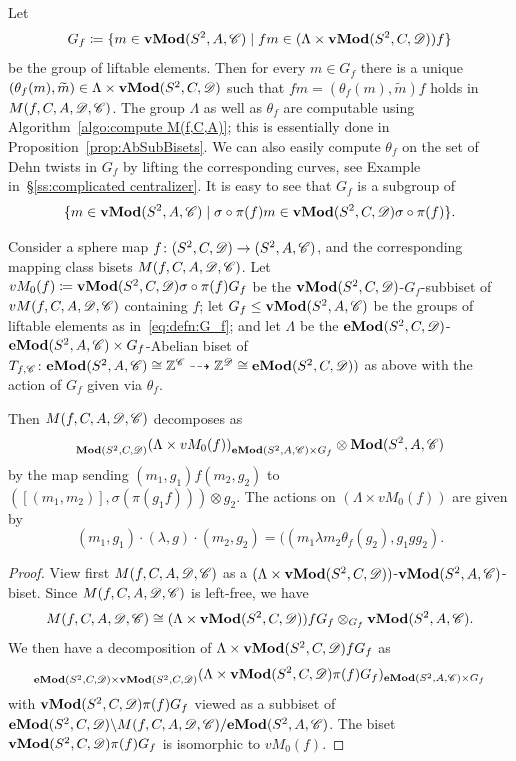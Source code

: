 \documentclass{amsart}
\begin{document}
Let
\begin{equation}\label{eq:defn:G_f}
  G_f\coloneqq \{m\in  \Mod[v](S^2,A,\CC) \mid f m\in(\Lambda\times \Mod[v](S^2,C,\DD))f\}
\end{equation}
be the group of liftable elements. Then for every $m\in G_f$ there is
a unique
$(\theta_f(m), \widetilde m)\in \Lambda\times\Mod[v](S^2,C,\DD)$ such
that $f m=(\theta_f(m), \widetilde m)f$ holds in
$M(f,C,A,\DD,\CC)$. The group $\Lambda$ as well as $\theta_f$ are
computable using Algorithm~\ref{algo:compute M(f,C,A)}; this is
essentially done in Proposition~\ref{prop:AbSubBisets}. We can also
easily compute $\theta_f$ on the set of Dehn twists in $G_f$ by
lifting the corresponding curves, see Example in~\S\ref{ss:complicated
  centralizer}.  It is easy to see that $G_f$ is a subgroup of
\[ \{m\in\Mod[v](S^2,A,\CC) \mid \sigma\circ \pi(f)m\in\Mod[v](S^2,C,\DD) \sigma\circ\pi(f)\}.\]

\begin{thm}\label{thm:M xproduct}
  Consider a sphere map $f\colon(S^2,C,\DD) \to (S^2,A,\CC)$, and the
  corresponding mapping class bisets $M(f,C,A,\DD, \CC)$. Let
  $vM_0(f)\coloneqq \Mod[v](S^2,C,\DD) \sigma\circ \pi(f) G_f$ be the
  $ \Mod[v](S^2,C,\DD)$-$G_f$-subbiset of $vM(f,C,A,\DD, \CC)$
  containing $f$; let $G_f\le \Mod[v](S^2,A,\CC)$ be the groups of
  liftable elements as in~\eqref{eq:defn:G_f}; and let $\Lambda$ be
  the $\Mod[e](S^2,C,\DD)$-$\Mod[e](S^2,A,\CC) \times G_f$-Abelian
  biset of
  $T_{f,\CC}\colon \Mod[e](S^2,A,\CC) \cong \Z^\CC\dashrightarrow
  \Z^\DD\cong \Mod[e](S^2,C,\DD))$ as above with the action of $G_f$
  given via $\theta_f$.

  \noindent Then $M(f,C,A,\DD,\CC)$ decomposes as
  \[\subscript{\Mod(S^2,C,\DD)}{(\Lambda\times vM_0(f))}_{ \Mod[e](S^2,A,\CC) \times G_f} \otimes \Mod(S^2,A,\CC)
   \] by the map sending $(m_1,g_1)f(m_2,g_2)$ to
   $([(m_1,m_2)],\sigma(\pi(g_1 f)))\otimes g_2$. The actions on
   $(\Lambda\times vM_0(f))$ are given by
   \[(m_1,g_1)\cdot(\lambda,g)\cdot(m_2,g_2)=((m_1\lambda
     m_2\theta_f(g_2),g_1 g g_2).\]
\end{thm}   
\begin{proof}
  View first $M(f,C,A,\DD,\CC)$ as a
  $(\Lambda\times\Mod[v](S^2,C,\DD))$-$\Mod[v](S^2,A,\CC)$-biset. Since
  $M(f,C,A,\DD,\CC)$ is left-free, we have
  \[M(f,C,A,\DD,\CC)\cong(\Lambda\times \Mod[v](S^2,C,\DD))f G_f \otimes_{G_f}
    \Mod[v](S^2,A,\CC).
  \]
  We then have a decomposition of
  $\Lambda \times \Mod[v](S^2,C,\DD)f G_f$ as
  \[\subscript{\Mod[e](S^2,C,\DD) \times
      \Mod[v](S^2,C,\DD)}(\Lambda\times \Mod[v](S^2,C,\DD)
    \pi(f)G_f)_{\Mod[e](S^2,A,\CC) \times G_f}
  \]
  with $\Mod[v](S^2,C,\DD) \pi(f)G_f$ viewed as a subbiset of
  $\Mod[e](S^2,C,\DD)\backslash M(f,C,A,\DD,\CC)/\Mod[e](S^2,A,\CC)$. The
  biset $\Mod[v](S^2,C,\DD) \pi(f)G_f$ is isomorphic to $vM_0(f)$.
\end{proof}
\end{document}
